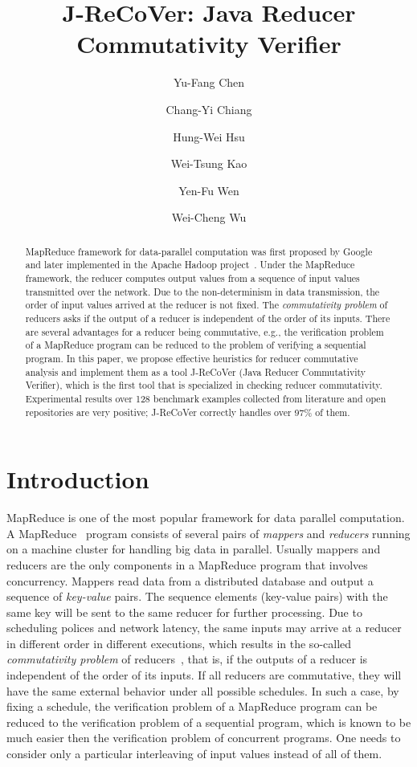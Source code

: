 \documentclass{llncs}
\title{J-ReCoVer: Java Reducer Commutativity Verifier}
\author{
Yu-Fang Chen\inst{1}\inst{2}
\and
Chang-Yi Chiang\inst{2}
\and
Hung-Wei Hsu\inst{1}
\and
Wei-Tsung Kao\inst{1}
\and
Yen-Fu Wen\inst{2}
\and
Wei-Cheng Wu\inst{1}
}
\institute
{
Institute of Information Science, Academia Sinica, Taiwan
\and
Graduate Institute of Information Management, National Taipei University, Taiwan
}
\begin{document}
\maketitle

\begin{abstract}
	
MapReduce framework for data-parallel computation was first proposed by Google~\cite{dean04} and later implemented in the Apache Hadoop project~\cite{hadoop}.
Under the MapReduce framework, the reducer computes output values from a sequence of input values transmitted over the network.  Due to the non-determinism in data transmission, the order of input values arrived at the reducer is not fixed.
The \emph{commutativity problem} of reducers asks if the output of a reducer is independent of the order of its inputs. There are several advantages for a reducer being commutative, e.g., the verification problem of a MapReduce program can be reduced to the problem of verifying a sequential program. 
In this paper, we propose effective heuristics for reducer commutative analysis and implement them as a tool J-ReCoVer (Java Reducer Commutativity Verifier), which is the first tool that is specialized in checking reducer commutativity. Experimental results over 128 benchmark examples collected from literature and open repositories are very positive; J-ReCoVer correctly handles over 97\% of them.


\end{abstract}

\section{Introduction}
\label{section:introduction}

MapReduce is one of the most popular framework for data parallel computation.
A MapReduce~\cite{dean04,hadoop} program consists of several pairs of \emph{mappers} and \emph{reducers} running on a machine cluster for handling big data in parallel. Usually mappers and reducers are the only components in a MapReduce program that involves concurrency. Mappers read data from a distributed database and output a sequence of \emph{key-value} pairs. The sequence elements (key-value pairs) with the same key will be sent to the same reducer for further processing. Due to scheduling polices and network latency, the same inputs may arrive at a reducer in different order in different executions, which results in the so-called \emph{commutativity problem} of reducers~\cite{csallner13testing,xiao14mr,ChenHSW15,ChenSW16}, that is, if the outputs of a reducer is independent of the order of its inputs. 
If all reducers are commutative, they will have the same external behavior under all possible schedules. In such a case, by fixing a schedule, the verification problem of a MapReduce program can be reduced to the verification problem of a sequential program, which is known to be much easier then the verification problem of concurrent programs. One needs to consider only a particular interleaving of input values instead of all of them.
\end{document}
